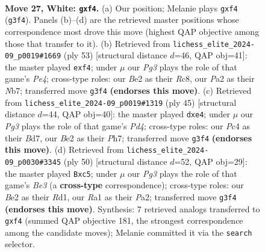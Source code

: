 \documentclass[11pt]{article}
\begin{document}
\clearpage

\begin{figure}[p]\centering
\begin{subfigure}{0.46\textwidth}\centering
\resizebox{\linewidth}{!}{%
\newchessgame
\chessboard[
  setfen={r5k1/pbpp4/1p3n1p/5p2/2P2p2/NP4P1/P2PBK1P/R7 w - - 0 27},
  showmover=false,
  pgfstyle=straightmove, color=movearrow, markmove={g3-f4}
]}
\caption{}
\end{subfigure}\hfill
\begin{subfigure}{0.46\textwidth}\centering
\resizebox{\linewidth}{!}{%
\newchessgame
\chessboard[
  setfen={2r1k3/pn2b1pp/5p2/2p1p3/N1P2PP1/6B1/PP5P/3R2K1 b - - 0 27},
  showmover=false,
  pgfstyle=straightmove, color=movearrow, markmove={e5-f4}
]}
\caption{}
\end{subfigure}
\\[4pt]
\begin{subfigure}{0.46\textwidth}\centering
\resizebox{\linewidth}{!}{%
\newchessgame
\chessboard[
  setfen={7r/pp1b3p/1n2pkp1/3p4/4PP2/NP4P1/P2K2BP/7R b - - 0 23},
  showmover=false,
  pgfstyle=straightmove, color=movearrow, markmove={d5-e4}
]}
\caption{}
\end{subfigure}\hfill
\begin{subfigure}{0.46\textwidth}\centering
\resizebox{\linewidth}{!}{%
\newchessgame
\chessboard[
  setfen={2r3k1/1p3p1p/5np1/1Nb5/2p5/2P1B2P/PP3PP1/3R2K1 w - - 7 26},
  showmover=false,
  pgfstyle=straightmove, color=movearrow, markmove={e3-c5}
]}
\caption{}
\end{subfigure}
\caption{\textbf{Move 27, White: \texttt{gxf4}.} (a) Our position; Melanie plays \texttt{gxf4} (\texttt{g3f4}). Panels (b)--(d) are the retrieved master positions whose correspondence most drove this move (highest QAP objective among those that transfer to it). (b) Retrieved from \texttt{lichess\_elite\_2024-09\_p0019\#1669} (ply 53) [structural distance $d$=46, QAP obj=41]: the master played \texttt{exf4}; under $\mu$ our \emph{Pg3} plays the role of that game's \emph{Pe4}; cross-type roles: our \emph{B}e2 as their \emph{R}c8, our \emph{P}a2 as their \emph{N}b7; transferred move \texttt{g3f4} \textbf{(endorses this move)}. (c) Retrieved from \texttt{lichess\_elite\_2024-09\_p0019\#1319} (ply 45) [structural distance $d$=44, QAP obj=40]: the master played \texttt{dxe4}; under $\mu$ our \emph{Pg3} plays the role of that game's \emph{Pd4}; cross-type roles: our \emph{P}c4 as their \emph{B}d7, our \emph{B}e2 as their \emph{P}h7; transferred move \texttt{g3f4} \textbf{(endorses this move)}. (d) Retrieved from \texttt{lichess\_elite\_2024-09\_p0030\#3345} (ply 50) [structural distance $d$=52, QAP obj=29]: the master played \texttt{Bxc5}; under $\mu$ our \emph{Pg3} plays the role of that game's \emph{Be3} (a \textbf{cross-type} correspondence); cross-type roles: our \emph{B}e2 as their \emph{R}d1, our \emph{R}a1 as their \emph{P}a2; transferred move \texttt{g3f4} \textbf{(endorses this move)}. Synthesis: 7 retrieved analogs transferred to \texttt{gxf4} (summed QAP objective 181, the strongest correspondence among the candidate moves); Melanie committed it via the \texttt{search} selector.}
\label{fig:thought-m52}
\end{figure}
\end{document}
